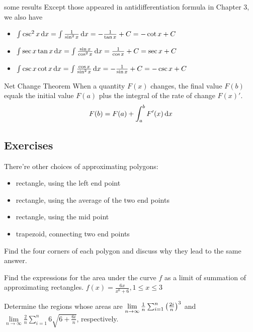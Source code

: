 \documentclass[Calculus 1 Recitation.tex]{subfiles}
\begin{document}
\begin{myleftlinebox}
	some results
	\tcblower
	Except those appeared in antidifferentiation formula in Chapter 3, we also have
	\begin{itemize}
		\item $\int \csc^2 x\,\mathrm{d} x = \int \frac{1}{\sin^2 x} \,\mathrm{d} x = -\frac{1}{\tan x}+C=-\cot x +C$
		\item $\int \sec x\tan x\,\mathrm{d} x = \int \frac{\sin x}{\cos^2 x}\,\mathrm{d} x = \frac{1}{\cos x}+C = \sec x + C$
		\item $\int \csc x\cot x\,\mathrm{d} x = \int \frac{\cos x}{\sin^2 x}\,\mathrm{d} x = -\frac{1}{\sin x}+C = -\csc x + C$
	\end{itemize}
\end{myleftlinebox}

\begin{myleftlinebox}
	Net Change Theorem
	\tcblower
	When a quantity $F(x)$ changes, the final value $F(b)$ equals the initial value $F(a)$ plus the integral of the rate of change $F(x)'$.
	\[F(b) = F(a)+\int_a^b F'(x)\,\mathrm{d} x\]
\end{myleftlinebox}

\subsection{Exercises}
\begin{myleftlinebox}
	There're other choices of approximating polygons:
	\begin{itemize}
		\item rectangle, using the left end point
		\item rectangle, using the average of the two end points
		\item rectangle, using the mid point
		\item trapezoid, connecting two end points
	\end{itemize}
	Find the four corners of each polygon and discuss why they lead to the same answer.
	\tcblower
	\vspace{2em}
\end{myleftlinebox}

\begin{myleftlinebox}
	Find the expressions for the area under the curve $f$ as a limit of summation of approximating rectangles. $f(x)=\frac{6x}{x^6+6}, 1\leq x\leq 3$
	\tcblower
	\vspace{2em}
\end{myleftlinebox}

\begin{myleftlinebox}
	Determine the regions whose areas are $\lim\limits_{n\to\infty} \frac{1}{n}\sum_{i=1}^n \left( \frac{2i}{n} \right)^3$ and $\lim\limits_{n\to\infty} \frac{2}{n}\sum_{i=1}^n 6\sqrt{6+\frac{6i}{n}}$, respectively.
	\tcblower
	\vspace{2em}
\end{myleftlinebox}
\end{document}
